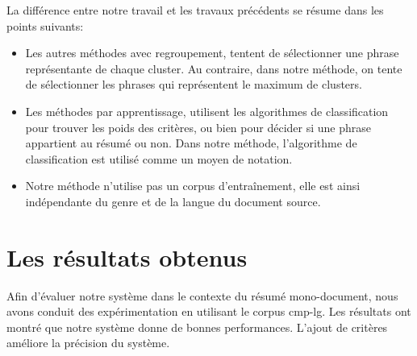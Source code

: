 \documentclass[a4paper,12pt,oneside]{../use/ESIthesis}
\begin{document}
La différence entre notre travail et les travaux précédents se résume dans les points suivants: 
\begin{itemize}
\item Les autres méthodes avec regroupement, tentent de sélectionner une phrase représentante de chaque cluster. 
Au contraire, dans notre méthode, on tente de sélectionner les phrases qui représentent le maximum de clusters. 

\item Les méthodes par apprentissage, utilisent les algorithmes de classification pour trouver les poids des critères, ou bien pour décider si une phrase appartient au résumé ou non. 
Dans notre méthode, l'algorithme de classification est utilisé comme un moyen de notation. 

\item Notre méthode n'utilise pas un corpus d'entraînement, elle est ainsi indépendante du genre et de la langue du document source.
\end{itemize}

\section*{Les résultats obtenus}

Afin d'évaluer notre système dans le contexte du résumé mono-document, nous avons conduit des expérimentation en utilisant le corpus cmp-lg. 
Les résultats ont montré que notre système donne de bonnes performances. 
L'ajout de critères améliore la précision du système. 
\end{document}
